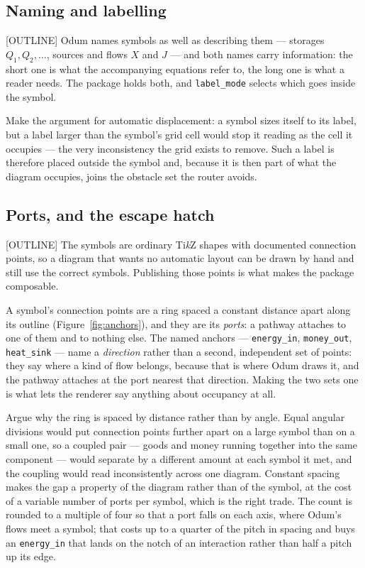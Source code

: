 \subsection{Naming and labelling}
[OUTLINE] Odum names symbols as well as describing them --- storages $Q_1,
Q_2, \ldots$, sources and flows $X$ and $J$ --- and both names carry
information: the short one is what the accompanying equations refer to, the long
one is what a reader needs. The package holds both, and
\texttt{label\_mode} selects which goes inside the symbol.

Make the argument for automatic displacement: a symbol sizes itself to its
label, but a label larger than the symbol's grid cell would stop it reading as
the cell it occupies --- the very inconsistency the grid exists to remove. Such
a label is therefore placed outside the symbol and, because it is then part of
what the diagram occupies, joins the obstacle set the router avoids.

\subsection{Ports, and the escape hatch}
[OUTLINE] The symbols are ordinary Ti\emph{k}Z shapes with documented
connection points, so a diagram that wants no automatic layout can be drawn by
hand and still use the correct symbols. Publishing those points is what makes
the package composable.

A symbol's connection points are a ring spaced a constant distance apart along
its outline (Figure~\ref{fig:anchors}), and they are its \emph{ports}: a
pathway attaches to one of them and to nothing else. The named anchors ---
\texttt{energy\_in}, \texttt{money\_out}, \texttt{heat\_sink} --- name a
\emph{direction} rather than a second, independent set of points: they say where
a kind of flow belongs, because that is where Odum draws it, and the pathway
attaches at the port nearest that direction. Making the two sets one is what
lets the renderer say anything about occupancy at all.

Argue why the ring is spaced by distance rather than by angle. Equal angular
divisions would put connection points further apart on a large symbol than on a
small one, so a coupled pair --- goods and money running together into the same
component --- would separate by a different amount at each symbol it met, and
the coupling would read inconsistently across one diagram. Constant spacing
makes the gap a property of the diagram rather than of the symbol, at the cost
of a variable number of ports per symbol, which is the right trade. The count is
rounded to a multiple of four so that a port falls on each axis, where Odum's
flows meet a symbol; that costs up to a quarter of the pitch in spacing and buys
an \texttt{energy\_in} that lands on the notch of an interaction rather than
half a pitch up its edge.

